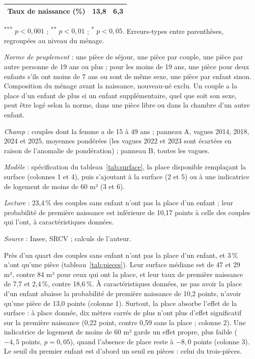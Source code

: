 \documentclass[11pt,a4paper]{article}
\theoremstyle{plain}
\theoremstyle{definition}
\theoremstyle{remark}
\newcommand{\sym}[1]{\textsuperscript{#1}}
\begin{document}
\begin{table}[htbp]
\begin{threeparttable}
\begin{tabular}{@{}lcccccc@{}}
Taux de naissance (\%)   & \multicolumn{3}{c}{13,8} & \multicolumn{3}{c}{6,3} \\
\bottomrule
\end{tabular}
\begin{tablenotes}\scriptsize
\item \sym{***} $p<0{,}001$ ; \sym{**} $p<0{,}01$ ; \sym{*} $p<0{,}05$. Erreurs-types entre parenthèses, regroupées au niveau du ménage.
\item \textit{Norme de peuplement} : une pièce de séjour, une pièce par couple, une pièce par autre personne de 19 ans ou plus ; pour les moins de 19 ans, une pièce pour deux enfants s'ils ont moins de 7 ans ou sont de même sexe, une pièce par enfant sinon. Composition du ménage avant la naissance, nouveau-né exclu. Un couple a la place d'un enfant de plus si un enfant supplémentaire, quel que soit son sexe, peut être logé selon la norme, dans une pièce libre ou dans la chambre d'un autre enfant.
\item \textit{Champ} : couples dont la femme a de 15 à 49 ans ; panneau A, vagues 2014, 2018, 2024 et 2025, moyennes pondérées (les vagues 2022 et 2023 sont écartées en raison de l'anomalie de pondération) ; panneau B, toutes les vagues.
\item \textit{Modèle} : spécification du tableau~\ref{tab:surface}, la place disponible remplaçant la surface (colonnes 1 et 4), puis s'ajoutant à la surface (2 et 5) ou à une indicatrice de logement de moins de 60 m² (3 et 6).
\item \textit{Lecture} : 23,4\,\% des couples sans enfant n'ont pas la place d'un enfant ; leur probabilité de première naissance est inférieure de 10,17 points à celle des couples qui l'ont, à caractéristiques données.
\item \textit{Source} : Insee, SRCV ; calculs de l'auteur.
\end{tablenotes}
\end{threeparttable}
\end{table}

Près d'un quart des couples sans enfant n'ont pas la place d'un enfant, et 3\,\% n'ont qu'une pièce (tableau~\ref{tab:pieces}). Leur surface médiane est de 47 et 29 m², contre 84 m² pour ceux qui ont la place, et leur taux de première naissance de 7,7 et 2,4\,\%, contre 18,6\,\%. À caractéristiques données, ne pas avoir la place d'un enfant abaisse la probabilité de première naissance de 10,2 points, n'avoir qu'une pièce de 13,0 points (colonne 1). Surtout, la place absorbe l'effet de la surface : à place donnée, dix mètres carrés de plus n'ont plus d'effet significatif sur la première naissance (0,22 point, contre 0,59 sans la place ; colonne 2). Une indicatrice de logement de moins de 60 m² garde un effet propre, plus faible ($-4{,}5$ points, $p = 0{,}05$), quand l'absence de place reste à $-8{,}0$ points (colonne 3). Le seuil du premier enfant est d'abord un seuil en pièces : celui du trois-pièces.
\end{document}
